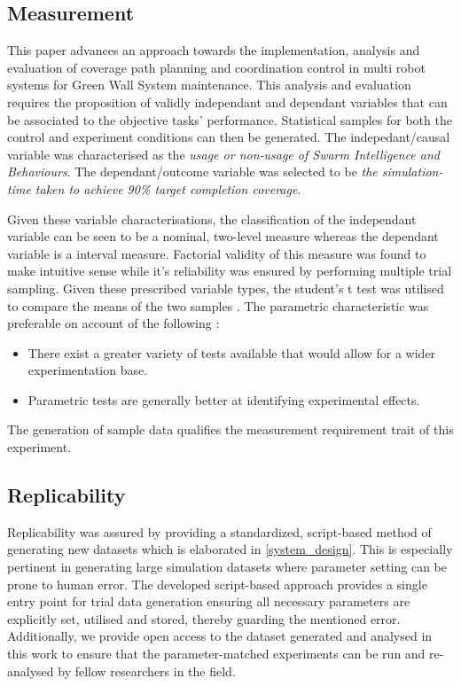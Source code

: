 \documentclass{report}
\begin{document}
\subsection{Measurement}

This paper advances an approach towards the implementation, analysis and evaluation of coverage path planning and coordination control in multi robot systems for Green Wall System maintenance. This analysis and evaluation requires the proposition of validly independant and dependant variables that can be associated to the objective tasks' performance. Statistical samples for both the control and experiment conditions can then be generated. The indepedant/causal variable was characterised as the \textit{usage or non-usage of Swarm Intelligence and Behaviours}. The dependant/outcome variable was selected to be \textit{the simulation-time taken to achieve 90\% target completion coverage}.

Given these variable characterisations, the classification of the independant variable can be seen to be a nominal, two-level measure whereas the dependant variable is a interval measure. Factorial validity of this measure was found to make intuitive sense \cite{Field2012} while it's reliability was ensured by performing multiple trial sampling. Given these prescribed variable types, the student's t test was utilised to compare the means of the two samples \cite{Donald2008}. The parametric characteristic was preferable on account of the following \cite{Field2012}:
\begin{itemize}
	\item There exist a greater variety of tests available that would allow for a wider experimentation base.
	\item Parametric tests are generally better at identifying experimental effects.
\end{itemize}
The generation of sample data qualifies the measurement requirement trait of this experiment.

\subsection{Replicability}

Replicability was assured by providing a standardized, script-based method of generating new datasets which is elaborated in \ref{system_design}. This is especially pertinent in generating large simulation datasets where parameter setting can be prone to human error. The developed script-based approach provides a single entry point for trial data generation ensuring all necessary parameters are explicitly set, utilised and stored, thereby guarding the mentioned error. Additionally, we provide open access to the dataset generated and analysed in this work to ensure that the parameter-matched experiments can be run and re-analysed by fellow researchers in the field.
\end{document}
